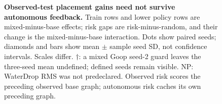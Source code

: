 \begin{figure}[t]
\caption{\textbf{Observed-test placement gains need not survive autonomous feedback.} Train rows and lower policy rows are mixed-minus-base effects; risk gaps are risk-minus-random, and their change is the mixed-minus-base interaction. Dots show paired seeds; diamonds and bars show mean $\pm$ sample seed SD, not confidence intervals. Scales differ. $\dagger$: a mixed Goop seed-2 guard leaves the three-seed mean undefined; defined seeds remain visible. NP: WaterDrop RMS was not predeclared. Observed risk scores the preceding observed base graph; autonomous risk caches its own preceding graph.}
\label{fig:cross-material-evidence}
\end{figure}
